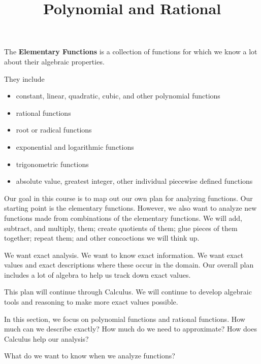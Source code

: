 \documentclass{ximera}
\title{Polynomial and Rational}
\begin{document}
\begin{abstract}
\end{abstract}
\maketitle




The \textbf{Elementary Functions} is a collection of functions for which we know a lot about their algebraic properties.

They include 

\begin{itemize}
\item constant, linear, quadratic, cubic, and other polynomial functions
\item rational functions
\item root or radical functions
\item exponential and logarithmic functions
\item trigonometric functions
\item absolute value, greatest integer, other individual piecewise defined functions
\end{itemize}








Our goal in this course is to map out our own plan for analyzing functions.  Our starting point is the elementary functions. However, we also want to analyze new functions made from combinations of the elementary functions.  We will add, subtract, and multiply, them; create quotients of them; glue pieces of them together; repeat them; and other concoctions we will think up.

We want exact analysis.  We want to know exact information.  We want exact values and exact descriptions where these occur in the domain. Our overall plan includes a lot of algebra to help us track down exact values.  


This plan will continue through Calculus.  We will continue to develop algebraic tools and reasoning to make more exact values possible.

In this section, we focus on polynomial functions and rational functions.  How much can we describe exactly? How much do we need to approximate? How does Calculus help our analysis?


What do we want to know when we analyze functions?
\end{document}
